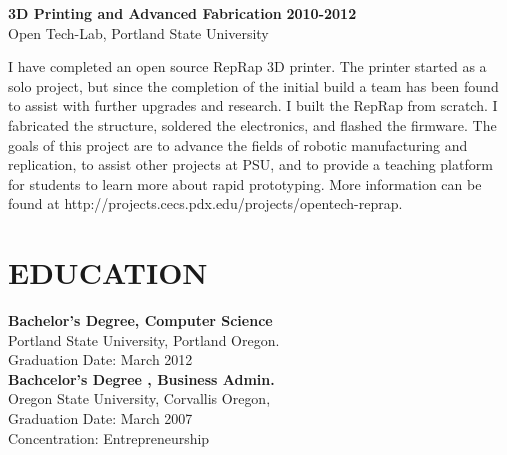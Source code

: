 \documentclass[overlapped]{res}
\begin{document}
\begin{resume}
\begin{itemize}[leftmargin=0in]
\begin{itemize}[leftmargin=0in]
\begin{samepage}
                    \textbf{3D Printing and Advanced Fabrication} \hfill \textbf{2010-2012} \\
                    Open Tech-Lab, Portland State University

                    I have completed an open source RepRap 3D printer. The printer started as a solo project, 
                    but since the completion of the initial build a team has been found to assist with further 
                    upgrades and research. I built the RepRap from scratch. I fabricated the structure, soldered  
                    the electronics, and flashed the firmware. 	The goals of this project are to advance the 
                    fields of robotic manufacturing and replication, to assist other projects at PSU, and to 
                    provide a teaching platform for students to learn more about rapid prototyping. 
                    More information can be found at http://projects.cecs.pdx.edu/projects/opentech-reprap. 
                \end{samepage}
        \end{itemize}
\end{itemize}
	
\section{EDUCATION} 
\begin{multicols}{2}
    \textbf{Bachelor's Degree, Computer Science} \\
    Portland State University, Portland Oregon. \\
    Graduation Date: March 2012 \\

    \columnbreak
    \textbf{Bachcelor's Degree , Business Admin.} \\
    Oregon State University, Corvallis Oregon, \\
    Graduation Date: March 2007 \\
    Concentration: Entrepreneurship
\end{multicols}


\end{resume}
\end{document}
